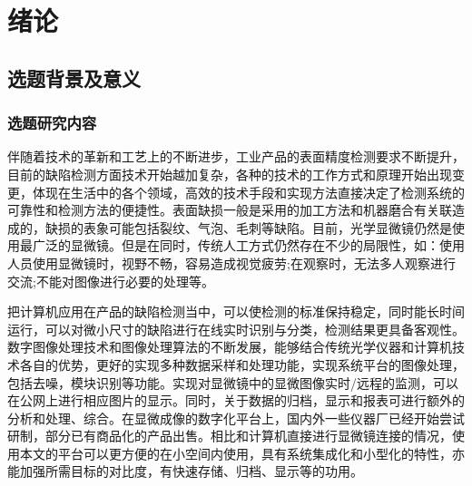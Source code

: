{\tiny {\tiny }}\chapter{绪论}
\section{选题背景及意义}
\subsection{选题研究内容}
伴随着技术的革新和工艺上的不断进步，工业产品的表面精度检测要求不断提升，目前的缺陷检测方面技术开始越加复杂，各种的技术的工作方式和原理开始出现变更，体现在生活中的各个领域，高效的技术手段和实现方法直接决定了检测系统的可靠性和检测方法的便捷性。表面缺损一般是采用的加工方法和机器磨合有关联造成的，缺损的表象可能包括裂纹、气泡、毛刺等缺陷。目前，光学显微镜仍然是使用最广泛的显微镜。但是在同时，传统人工方式仍然存在不少的局限性，如：使用人员使用显微镜时，视野不畅，容易造成视觉疲劳;在观察时，无法多人观察进行交流;不能对图像进行必要的处理等。


把计算机应用在产品的缺陷检测当中，可以使检测的标准保持稳定，同时能长时间运行，可以对微小尺寸的缺陷进行在线实时识别与分类，检测结果更具备客观性。数字图像处理技术和图像处理算法的不断发展，能够结合传统光学仪器和计算机技术各自的优势，更好的实现多种数据采样和处理功能，实现系统平台的图像处理，包括去噪，模块识别等功能\cite{machine}。实现对显微镜中的显微图像实时/远程的监测，可以在公网上进行相应图片的显示。同时，关于数据的归档，显示和报表可进行额外的分析和处理、综合。在显微成像的数字化平台上，国内外一些仪器厂已经开始尝试研制，部分已有商品化的产品出售\cite{light3D}\cite{eletnature}。相比和计算机直接进行显微镜连接的情况，使用本文的平台可以更方便的在小空间内使用，具有系统集成化和小型化的特性，亦能加强所需目标的对比度，有快速存储、归档、显示等的功用。


